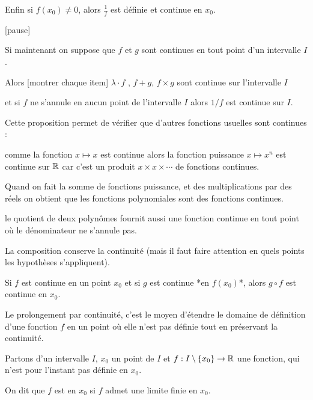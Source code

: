  Enfin si $f(x_0)\neq 0$, alors $\frac1f$ est définie et continue en $x_0$.
 
 
 [pause]
 
 Si maintenant on suppose que $f$ et $g$ sont continues en tout point d'un intervalle $I$.
 
 Alors  [montrer chaque item] $\lambda\cdot f$ ,  $f+g$,  $f\times g$ sont continue sur l'intervalle $I$

 et si $f$ ne s'annule en aucun point de l'intervalle $I$ alors $1/f$ est continue sur $I$.
 
 \change
 
 
Cette proposition permet de vérifier que d'autres fonctions usuelles sont continues :

\change

comme la fonction $x\mapsto x$ est continue alors 
la fonction puissance $x\mapsto x^n$ est continue sur $\mathbb{R}$ car c'est un produit $x \times x \times \cdots$
de fonctions continues.


\change

Quand on fait la somme de fonctions puissance, et des multiplications par des réels
on obtient que les fonctions polynomiales sont des fonctions continues.

\change

le quotient de deux polynômes fournit aussi une fonction continue en tout point où le dénominateur 
ne s'annule pas.



\diapo


La composition conserve la continuité (mais il faut faire attention en quels
points les hypothèses s'appliquent).


Si $f$ est continue en un point $x_0$ et si $g$ est continue *en $f(x_0)$*, 
alors $g\circ f$ est continue en $x_0$.


\diapo

Le prolongement par continuité, c'est le moyen d'étendre le domaine de définition
d'une fonction $f$ en un point où elle n'est pas définie tout en préservant la continuité.


Partons d'un intervalle $I$, $x_0$ un point de $I$ et $f:I\setminus\{x_0\}\to\mathbb{R}$ une fonction,
qui n'est pour l'instant pas définie en $x_0$.


\change

 On dit que $f$ est  en $x_0$ si $f$ admet une 
  limite finie en $x_0$. 
  
